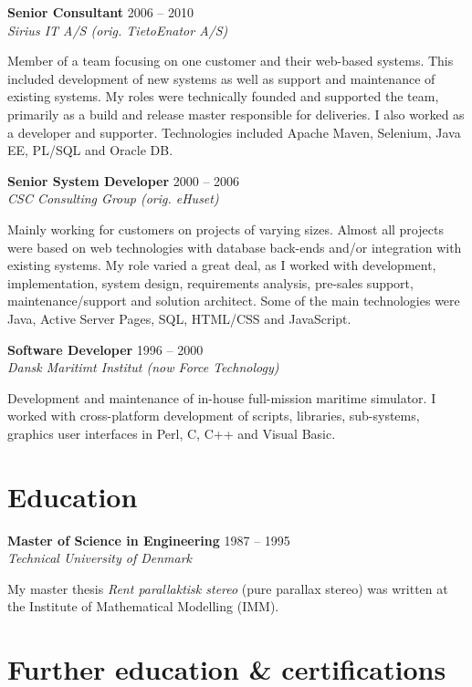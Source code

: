 \documentclass[a4paper,11pt]{article}
\begin{document}
\smallskip

\textbf{Senior Consultant} \hfill 2006 -- 2010 \\
\textsl{Sirius IT A/S (orig. TietoEnator A/S)}

Member of a team focusing on one customer and their web-based
systems. This included development of new systems as well as support
and maintenance of existing systems. My roles were technically founded
and supported the team, primarily as a build and release master
responsible for deliveries. I also worked as a developer and
supporter. Technologies included Apache Maven, Selenium, Java EE,
PL/SQL and Oracle DB.

\smallskip

\textbf{Senior System Developer} \hfill 2000 -- 2006 \\
\textsl{CSC Consulting Group (orig. eHuset)}

Mainly working for customers on projects of varying sizes. Almost all
projects were based on web technologies with database back-ends and/or
integration with existing systems.  My role varied a great deal, as I
worked with development, implementation, system design, requirements
analysis, pre-sales support, maintenance/support and solution
architect. Some of the main technologies were Java, Active Server
Pages, SQL, HTML/CSS and JavaScript.

\smallskip

\textbf{Software Developer} \hfill 1996 -- 2000 \\
\textsl{Dansk Maritimt Institut (now Force Technology)}

Development and maintenance of in-house full-mission maritime
simulator. I worked with cross-platform development of scripts,
libraries, sub-systems, graphics user interfaces in Perl, C, C++ and
Visual Basic.


\section*{Education}

\textbf{Master of Science in Engineering} \hfill 1987 -- 1995 \\
\textsl{Technical University of Denmark}

My master thesis \textit{Rent parallaktisk stereo} (pure parallax
stereo) was written at the Institute of Mathematical Modelling (IMM).


\section*{Further education \& certifications}
\end{document}
